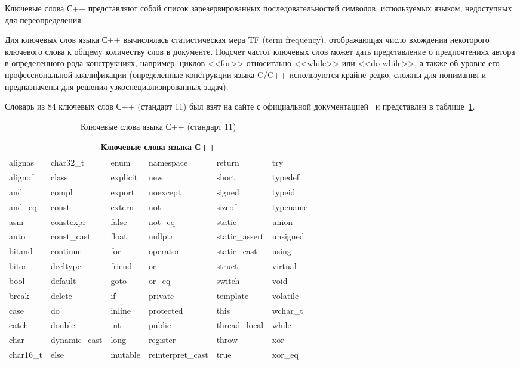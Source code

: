 Ключевые слова С++ представляют собой список зарезервированных последовательностей символов, 
используемых языком, недоступных для переопределения.

Для ключевых слов языка С++ вычислялась статистическая мера TF (term frequency), 
отображающая число вхождения некоторого ключевого слова к общему количеству слов в документе.
Подсчет частот ключевых слов может дать представление о предпочтениях автора в определенного рода конструкциях,
например, циклов <<for>> относитльно <<while>> или <<do while>>, 
а также об уровне его профессиональной квалификации (определенные конструкции языка C/C++ используются крайне
редко, сложны для понимания и предназначены для решения узкоспециализированных задач).

Словарь из 84 ключевых слов С++ (стандарт 11) был взят на сайте с официальной документацией~\cite{cppkeywords} 
и представлен в таблице~\ref{tab:3}.

\begin{table}[ht]
\caption{ Ключевые слова языка С++ (стандарт 11) }
\label{tab:3}
\begin{center}
\begin{tabularx}{\linewidth}{|X|X|X|X|X|X|}
\hline
\multicolumn{6}{|c|}{Ключевые слова языка С++} \\
\hline
alignas & char32\_t & enum & namespace & return & try\\
alignof & class & explicit & new & short & typedef\\
and & compl & export & noexcept & signed & typeid\\
and\_eq & const & extern & not & sizeof & typename\\
asm & constexpr & false & not\_eq & static & union\\
auto & const\_cast & float & nullptr & static\_assert & unsigned\\
bitand & continue & for & operator & static\_cast & using\\
bitor & decltype & friend & or & struct & virtual\\
bool & default & goto & or\_eq & switch & void\\
break & delete & if & private & template & volatile\\
case & do & inline & protected & this & wchar\_t\\
catch & double & int & public & thread\_local & while\\
char & dynamic\_cast & long & register & throw & xor\\
char16\_t & else & mutable & reinterpret\_cast & true & xor\_eq\\
\hline
\end{tabularx}
\end{center}
\end{table}